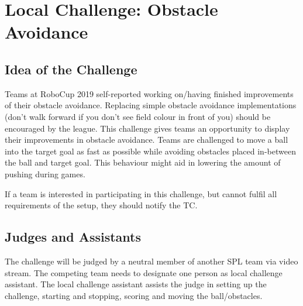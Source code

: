\section{Local Challenge: Obstacle Avoidance}
\label{sec:ObstacleAvoidance}

\subsection{Idea of the Challenge}

Teams at RoboCup 2019 self-reported working on/having finished improvements of their obstacle avoidance. Replacing simple obstacle avoidance implementations (don't walk forward if you don't see field colour in front of you) should be encouraged by the league. This challenge gives teams an opportunity to display their improvements in obstacle avoidance. Teams are challenged to move a ball into the target goal as fast as possible while avoiding obstacles placed in-between the ball and target goal. This behaviour might aid in lowering the amount of pushing during games.


If a team is interested in participating in this challenge, but cannot fulfil all requirements of the setup, they should notify the TC.

\subsection{Judges and Assistants}

The challenge will be judged by a neutral member of another SPL team via video stream. The competing team needs to designate one person as local challenge assistant. The local challenge assistant assists the judge in setting up the challenge, starting and stopping, scoring and moving the ball/obstacles.


